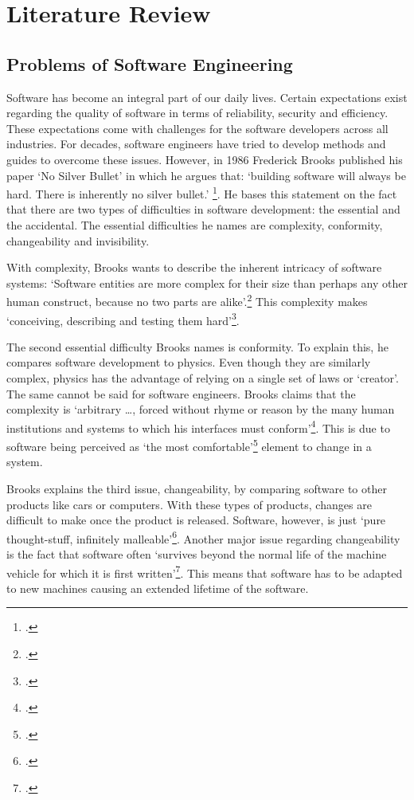 \section{Literature Review}
\subsection{Problems of Software Engineering}
Software has become an integral part of our daily lives. Certain expectations exist regarding the quality of software in terms of reliability, security and efficiency. These expectations come with challenges for the software developers across all industries.
For decades, software engineers have tried to develop methods and guides to overcome these issues. However, in 1986 Frederick Brooks published his paper `No Silver Bullet'
in which he argues that: `building software will always be hard. There is inherently no silver bullet.' \footcite[3]{brooksNoSilverBullet1987}. He bases this statement on the fact that there are two types of difficulties in software development: the essential and the accidental.
The essential difficulties he names are complexity, conformity, changeability and invisibility.

With complexity, Brooks wants to describe the inherent intricacy of software systems: `Software entities are more complex for their size than perhaps any other human construct, because no two parts are alike'.\footcite[3]{brooksNoSilverBullet1987}
This complexity makes `conceiving, describing and testing them hard'\footcite[3]{brooksNoSilverBullet1987}.

The second essential difficulty Brooks names is conformity. To explain this, he compares software development to physics. Even though they are similarly complex, physics has the advantage of relying on a single set of laws or `creator'. The same cannot be said for software engineers. Brooks claims that
the complexity is `arbitrary \ldots, forced without rhyme or reason by the many human institutions and systems to which his interfaces must conform'\footcite[4]{brooksNoSilverBullet1987}. This is due to software being perceived as `the most comfortable'\footcite[4]{brooksNoSilverBullet1987} element to change in a system.

Brooks explains the third issue, changeability, by comparing software to other products like cars or computers. With these types of products, changes are difficult to make once the product is released. Software, however, is just `pure thought-stuff, infinitely malleable'\footcite[4]{brooksNoSilverBullet1987}. Another major issue regarding changeability is
the fact that software often `survives beyond the normal life of the machine vehicle for which it is first written'\footcite[4]{brooksNoSilverBullet1987}. This means that software has to be adapted to new machines causing an extended lifetime of the software.

